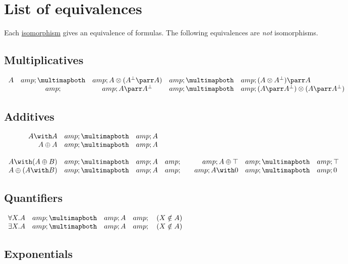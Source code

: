 \section{List of equivalences}\label{list-of-equivalences}

Each \href{List_of_isomorphisms}{isomorphism} gives an equivalence of
formulas. The following equivalences are \emph{not} isomorphisms.

\subsection{Multiplicatives}\label{multiplicatives-1}

\(\begin{array}{rcccl}
A &amp;\linequiv&amp; A \tens (A\orth\parr A) &amp;\linequiv&amp; (A\tens A\orth)\parr A \\
&amp; &amp; A\parr A\orth &amp;\linequiv&amp; (A\parr A\orth)\tens(A\parr A\orth)
\end{array}\)

\subsection{Additives}\label{additives-1}

\(\begin{array}{rclcrcl}
A \with A &amp;\linequiv&amp; A \\
A \plus A &amp;\linequiv&amp; A \\
\\
  A \with (A \plus B) &amp;\linequiv&amp; A &amp;\quad&amp; A \plus \top &amp;\linequiv&amp; \top \\
  A \plus (A \with B) &amp;\linequiv&amp; A &amp;\quad&amp; A \with \zero &amp;\linequiv&amp; \zero
\end{array}\)

\subsection{Quantifiers}\label{quantifiers}

\(\begin{array}{rcll}
  \forall X.A &amp;\linequiv&amp; A &amp;\quad (X\notin A) \\
  \exists X.A &amp;\linequiv&amp; A &amp;\quad (X\notin A)
\end{array}\)

\subsection{Exponentials}\label{exponentials-2}

